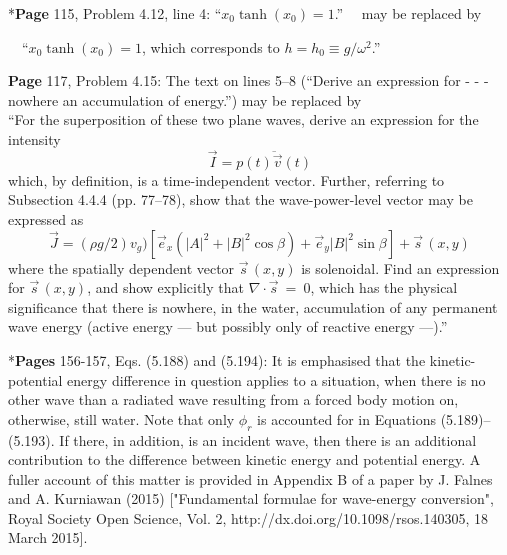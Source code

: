 \documentclass[a4paper,12pt]{article}
\begin{document}

\noindent %
*{\bf Page} 115, Problem 4.12, line 4:
``$x_0 \tanh(x_0) = 1$.'' \,\,\,\, may be replaced by \vspace{-0.2cm}

\,\,\,\, ``$x_0 \tanh(x_0) = 1$, which corresponds to $h = h_0 \equiv g/\omega^2$.''  
\vspace{-0.1cm} 
\newline  {$\diamondsuit$}  \vspace{0.15cm} %





\vspace{0.2cm}

\noindent %
{\bf Page} 117, Problem 4.15: The text on lines 5--8 (``Derive an expression for - - -  nowhere an accumulation of energy.'') may be replaced by\\
``For the superposition of these two plane waves, derive an expression for the intensity
\begin{displaymath}
\vec{I}=\overline{p(t) \vec{v}(t)}
\end{displaymath}
which, by definition, is a time-independent vector. Further, referring to Subsection 4.4.4 (pp. 77--78), show that the wave-power-level vector may be expressed as 
\begin{displaymath}
\vec{J} = (\rho g/2) v_g) \left[\vec{e}_x \left(|A|^{2} + |B|^{2} \cos \beta\right) + \vec{e}_y|B|^{2} \sin \beta \right] + \vec {s}\,(x,y) %
\end{displaymath}
where the spatially dependent vector $\vec {s}\,(x,y)$ is solenoidal. Find an expression for $\vec{s}\,(x,y)$, and show explicitly that $\nabla\!\cdot\!{\vec{s}} \ = \ 0$, which has the physical significance that there is nowhere, in the water, accumulation of any permanent wave energy (active energy --- but possibly only of reactive energy ---).''
\vspace{0.2cm} 

\noindent %
*{\bf Pages} 156-157, Eqs. (5.188) and (5.194): It is emphasised that the kinetic-potential energy difference in question applies to a situation, when there is no other wave than a radiated wave resulting from a forced body motion on, otherwise, still water. Note that only $\phi_r $ is accounted for in Equations (5.189)--(5.193). If there, in addition, is an incident wave, then there is an additional contribution to the difference between kinetic energy and potential energy. A fuller account of this matter is provided in Appendix B of a paper by J. Falnes and A. Kurniawan (2015) ["Fundamental formulae for wave-energy conversion", Royal Society Open Science, Vol. 2, http://dx.doi.org/10.1098/rsos.140305, 18 March 2015].
\newline  {$\diamondsuit$}  \vspace{0.25cm} %
\end{document}
